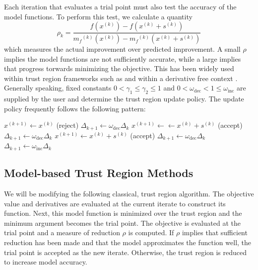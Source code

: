 \documentclass{article}
\theoremstyle{case}
\newcommand{\modelk}{{{m}_f}^{(k)}}
\newcommand{\iteratek}{{x}^{(k)}}
\newcommand{\trialk}{{s}^{(k)}}
\newcommand{\iteratekpone}{{x}^{(k+1)}}
\begin{document}
Each iteration that evaluates a trial point must also test the accuracy of the model functions.
To perform this test, we calculate a quantity
\begin{equation}
\label{rho}
\rho_k = \frac{f(\iteratek) - f(\iteratek+\trialk)}{\modelk(\iteratek) - \modelk(\iteratek+\trialk)}
\end{equation}
which measures the actual improvement over predicted improvement.
A small $\rho$ implies the model functions are not sufficiently accurate, while a large implies that progress torwards minimizing the objective.
This has been widely used within trust region frameworks such as \cite{Conn:2000:TM:357813} and within a derivative free context \cite{DUMMY:intro_book}.
Generally speaking, fixed constants $0 < \gamma_1 \le \gamma_2 \le 1$ and $0 < \omega_{\text{dec}} < 1 \le \omega_{\text{inc}}$ are supplied by the user and determine the trust region update policy.
The update policy frequently follows the following pattern:

\begin{algorithmic}
    \State $\iteratekpone \gets \iteratek$ (reject)
    \State $\Delta_{k+1} \gets \omega_{\text{dec}} \Delta_k$
    \State $\iteratekpone\gets \gets \iteratek + \trialk$ (accept)
    \State $\Delta_{k+1} \gets \omega_{\text{dec}} \Delta_k$
    \State $\iteratekpone \gets \iteratek + \trialk$ (accept)
    \If
        \State $\Delta_{k+1} \gets \omega_{\text{dec}} \Delta_k$
    \Else
        \State $\Delta_{k+1} \gets \omega_{\text{inc}} \Delta_k$
    \EndIf
\EndIf
\end{algorithmic}


\subsection{Model-based Trust Region Methods}

We will be modifying the following classical, trust region algorithm.
The objective value and derivatives are evaluated at the current iterate to construct its function.
Next, this model function is minimized over the trust region and the minimum argument becomes the trial point.
The objective is evaluated at the trial point and a measure of reduction $\rho$ is computed.
If $\rho$ implies that sufficient reduction has been made and that the model approximates the function well, the trial point is accepted as the new iterate.
Otherwise, the trust region is reduced to increase model accuracy.
\end{document}
